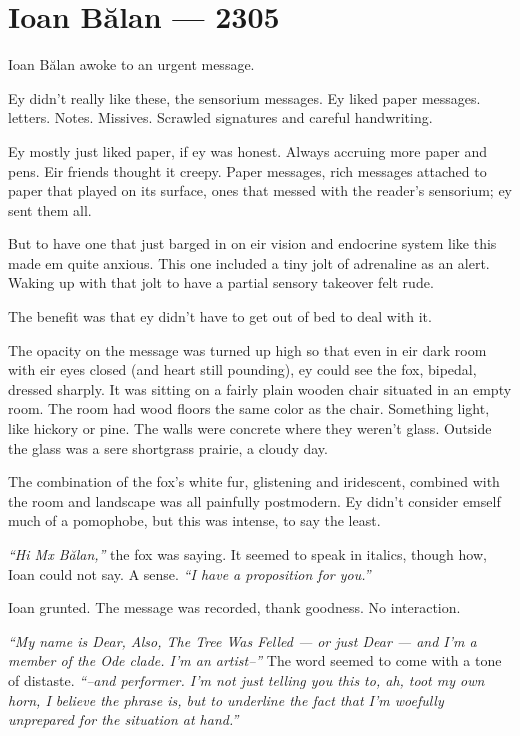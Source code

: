 \hypertarget{ioan-bux103lan-2305}{%
\chapter*{Ioan Bălan — 2305}\label{ioan-bux103lan-2305}}

Ioan Bălan awoke to an urgent message.

Ey didn't really like these, the sensorium messages. Ey liked paper messages. letters. Notes. Missives. Scrawled signatures and careful handwriting.

Ey mostly just liked paper, if ey was honest. Always accruing more paper and pens. Eir friends thought it creepy. Paper messages, rich messages attached to paper that played on its surface, ones that messed with the reader's sensorium; ey sent them all.

But to have one that just barged in on eir vision and endocrine system like this made em quite anxious. This one included a tiny jolt of adrenaline as an alert. Waking up with that jolt to have a partial sensory takeover felt rude.

The benefit was that ey didn't have to get out of bed to deal with it.

The opacity on the message was turned up high so that even in eir dark room with eir eyes closed (and heart still pounding), ey could see the fox, bipedal, dressed sharply. It was sitting on a fairly plain wooden chair situated in an empty room. The room had wood floors the same color as the chair. Something light, like hickory or pine. The walls were concrete where they weren't glass. Outside the glass was a sere shortgrass prairie, a cloudy day.

The combination of the fox's white fur, glistening and iridescent, combined with the room and landscape was all painfully postmodern. Ey didn't consider emself much of a pomophobe, but this was intense, to say the least.

\emph{``Hi Mx Bălan,''} the fox was saying. It seemed to speak in italics, though how, Ioan could not say. A sense. \emph{``I have a proposition for you.''}

Ioan grunted. The message was recorded, thank goodness. No interaction.

\emph{``My name is Dear, Also, The Tree Was Felled — or just Dear — and I'm a member of the Ode clade. I'm an artist--''} The word seemed to come with a tone of distaste. \emph{``--and performer. I'm not just telling you this to, ah, toot my own horn, I believe the phrase is, but to underline the fact that I'm woefully unprepared for the situation at hand.''}

